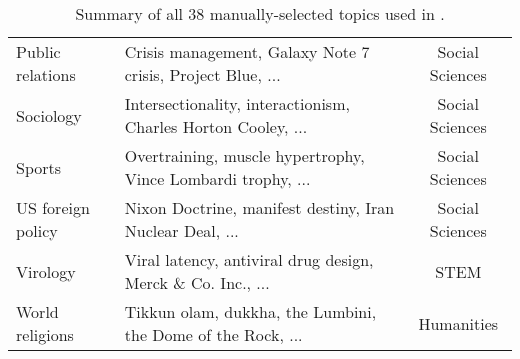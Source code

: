 \begin{table}[th]
\begin{tabular}{l l c}
        Public relations        & Crisis management, Galaxy Note 7 crisis, Project Blue, ...        & Social Sciences \\
        Sociology               & Intersectionality, interactionism, Charles Horton Cooley, ...     & Social Sciences \\
        Sports                  & Overtraining, muscle hypertrophy, Vince Lombardi trophy, ...      & Social Sciences \\
        US foreign policy       & Nixon Doctrine, manifest destiny, Iran Nuclear Deal, ...          & Social Sciences \\
        Virology                & Viral latency, antiviral drug design, Merck \& Co. Inc., ...      & STEM \\
        World religions         & Tikkun olam, dukkha, the Lumbini, the Dome of the Rock, ...       & Humanities \\
        \bottomrule
    \end{tabular}
    \caption{
    Summary of all 38 manually-selected topics used in \longfact{}.
    }
    \label{tab:longfact-list-of-topics}
\end{table}
